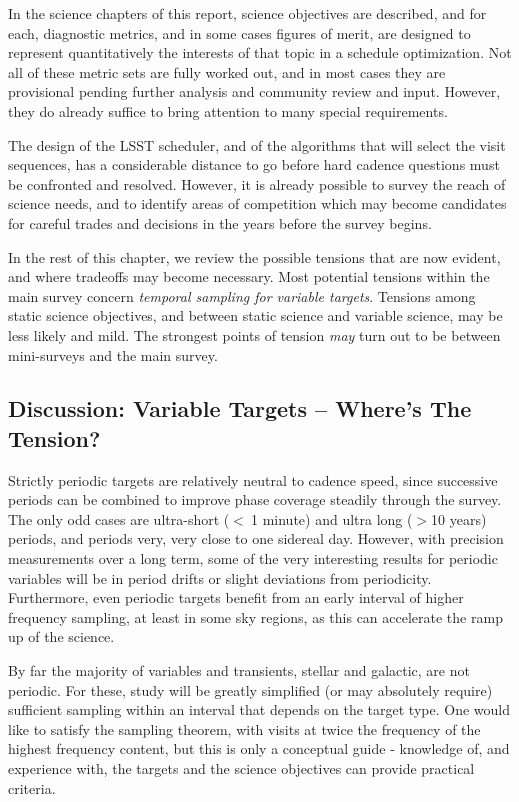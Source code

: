 In the science chapters of this report, science objectives are
described, and for each, diagnostic metrics, and in some cases figures
of merit, are designed to represent quantitatively the interests of that
topic in a schedule optimization.  Not all of these metric sets are
fully worked out, and in most cases they are provisional pending further
analysis and community review and input.  However, they do already
suffice to bring attention to many special requirements.

The design of the LSST scheduler, and of the algorithms that will select
the visit sequences, has a considerable distance to go before hard
cadence questions must be confronted and resolved.  However, it is
already possible to survey the reach of science needs, and to identify
areas of competition which may become candidates for careful trades and
decisions in the years before the survey begins.

In the rest of this chapter, we review the possible tensions that are
now evident, and where tradeoffs may become necessary. Most potential
tensions within the main survey concern {\it temporal sampling for
variable targets}.  Tensions among static science objectives, and
between static science and variable science, may be less likely and
mild. The strongest points of tension {\it may} turn out to be between
mini-surveys and the main survey.


\subsection{Discussion: Variable Targets -- Where's The Tension?}

Strictly periodic targets are relatively neutral to cadence speed, since
successive periods can be combined to improve phase coverage steadily
through the survey.  The only odd cases are ultra-short ($<~ $1 minute)
and ultra long ($> $10 years) periods, and periods very, very close to
one sidereal day.  However, with precision measurements over a long
term, some of the very interesting results for periodic variables will
be in period drifts or slight deviations from periodicity. Furthermore,
even periodic targets benefit from an early interval of higher frequency
sampling, at least in some sky regions, as this can accelerate the ramp
up of the science.

By far the majority of variables and transients, stellar and galactic,
are not periodic. For these, study will be greatly simplified (or may
absolutely require) sufficient sampling within an interval that depends
on the target type. One would like to satisfy the sampling theorem, with
visits at twice the frequency of the highest frequency content, but this
is only a conceptual guide - knowledge of, and experience with, the
targets and the science objectives can provide practical criteria.

